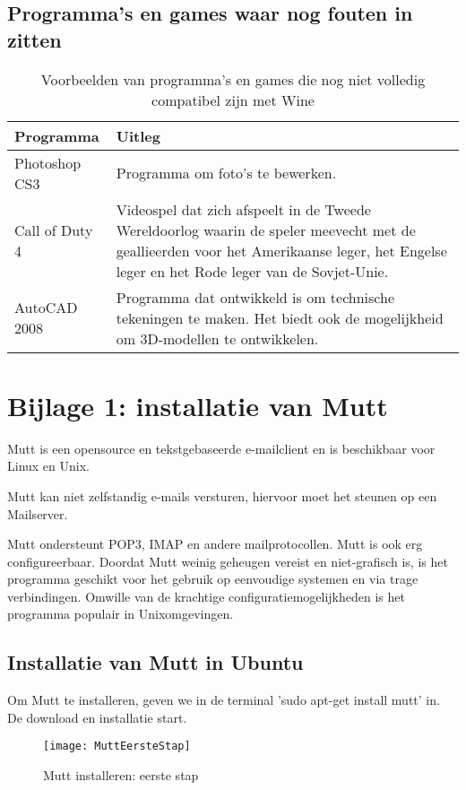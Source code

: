 \documentclass[12pt]{article}
\begin{document}
\subsection{Programma's en games waar nog fouten in zitten}
\begin{center}
\begin{table} [h]
\begin{tabular}{ | l | p{10cm} |}
	\hline
    Programma & Uitleg \\ \hline
   	 Photoshop CS3 & Programma om foto's te bewerken. \\ 			\hline
    Call of Duty 4 & Videospel dat zich afspeelt in de Tweede Wereldoorlog waarin de speler meevecht met de geallieerden voor het Amerikaanse leger, het Engelse leger en het Rode leger van de Sovjet-Unie. \\ \hline
    AutoCAD 2008 & Programma dat ontwikkeld is om technische tekeningen te maken. Het biedt ook de mogelijkheid om 3D-modellen te ontwikkelen.\\
    \hline
\end{tabular}
\caption{Voorbeelden van programma's en games die nog niet volledig compatibel zijn met Wine}
\end{table}
\end{center}
\newpage
\newpage
\section{Bijlage 1: installatie van Mutt}
Mutt is een opensource en tekstgebaseerde e-mailclient en is beschikbaar voor Linux en Unix.

Mutt kan niet zelfstandig e-mails versturen, hiervoor moet het steunen op een Mailserver.

Mutt ondersteunt POP3, IMAP en andere mailprotocollen. Mutt is ook erg configureerbaar. Doordat Mutt weinig geheugen vereist en niet-grafisch is, is het programma geschikt voor het gebruik op eenvoudige systemen en via trage verbindingen. Omwille van de krachtige configuratiemogelijkheden is het programma populair in Unixomgevingen.

\subsection{Installatie van Mutt in Ubuntu}
Om Mutt te installeren, geven we in de terminal 'sudo apt-get install mutt' in. De download en installatie start.
\begin{figure} [h]
\begin{center}
	\texttt{[image: MuttEersteStap]}
\end{center}
	\caption{Mutt installeren: eerste stap}
\end{figure}
\end{document}
